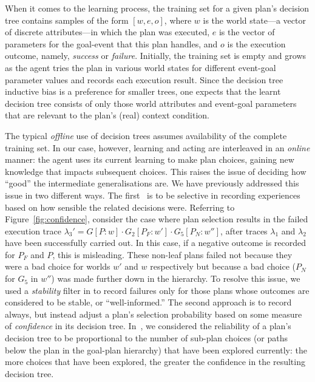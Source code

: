 When it comes to the learning process, the training set for a given plan's decision tree contains samples of the form $[w, e, o]$, where $w$ is the world state---a vector of discrete attributes---in which the plan was executed, $e$ is the vector of parameters for the goal-event that this plan handles, and $o$ is the execution outcome, namely, \emph{success} or \emph{failure}. Initially, the training set is empty and grows as the agent tries the plan in various world states for different event-goal parameter values and records each execution result. 
Since the decision tree inductive bias is a preference for smaller trees, one expects that the learnt decision tree consists of only those world attributes and event-goal parameters that are relevant to the plan's (real) context condition.

The typical {\em offline} use of decision trees assumes availability of the complete training set. In our case, however, learning and acting are interleaved in an {\em online} manner: the agent uses its current learning to make plan choices, gaining new knowledge that impacts subsequent choices. This raises the issue of deciding how ``good'' the intermediate generalisations are. We have previously addressed this issue in two different ways. The first~\cite{airiau09:enhancing} is to be selective in recording experiences based on how sensible the related decisions were. 
Referring to Figure~\ref{fig:confidence}, consider the case where plan selection results in the failed execution trace $\lambda_3' = G[P:w] \cdot G_2[P_F:w'] \cdot G_5[P_N:w'']$, after traces $\lambda_1$ and $\lambda_2$ have been successfully carried out. 
In this case, if a negative outcome is recorded for $P_F$ and $P$, this is misleading. These non-leaf plans failed
not because they were a bad choice for worlds $w'$ and $w$ respectively but because a bad choice ($P_N$ for $G_5$ in $w''$) was made further down in the hierarchy. To resolve this issue, we used a {\em stability} filter in \cite{airiau09:enhancing} to record failures only for those plans whose outcomes are considered to be stable, or ``well-informed.'' 
The second approach is to record always, but instead adjust a plan's selection probability based on some measure of {\em confidence} in its decision tree. In~\cite{singh10:extending,singh10:learning}, we considered the reliability of a plan's decision tree to be proportional to the number of sub-plan choices (or paths below the plan in the goal-plan hierarchy) that have been explored currently: the more choices that have been explored, the greater the confidence in the resulting decision tree. 

